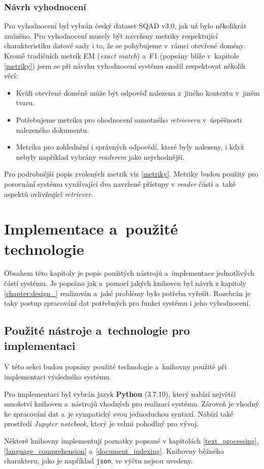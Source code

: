 \subsection{Návrh vyhodnocení}
Pro vyhodnocení byl vybrán český dataset SQAD v3.0, jak už bylo několikrát zmíněno. Pro vyhodnocení musely být navrženy metriky respektující charakteristiku datové sady i to, že se pohybujeme v~rámci otevřené domény. Kromě tradičních metrik EM (\emph{exact match}) a~F1 (popsány blíže v~kapitole \ref{metriky}) jsem se při návrhu vyhodnocení systému snažil respektovat několik věcí:
\begin{itemize}
    \item Kvůli otevřené doméně může být odpověď nalezena z~jiného kontextu v~jiném tvaru.
    \item Potřebujeme metriku pro ohodnocení samotného \emph{retrieveru} v~úspěšnosti nalezeného dokumentu.
    \item Metriku pro zohlednění i správných odpovědí, které byly nalezeny, i když nebyly například vybrány \emph{readerem} jako nejvhodnější.
\end{itemize}
Pro podrobnější popis zvolených metrik viz \ref{metriky}. Metriky budou použity pro porovnání systému využívající dva navržené přístupy v \emph{reader} části a~také aspektů ovlivňující \emph{retriever}.


\chapter{Implementace a~použité technologie}
\label{chapter:implementace}
Obsahem této kapitoly je popis použitých nástrojů a~implementace jednotlivých částí systému. Je popsáno jak a~pomocí jakých knihoven byl návrh z kapitoly \ref{chapter:design_} realizován a~jaké problémy bylo potřeba vyřešit. Rozebrán je taky postup zpracování dat potřebných pro funkci systému i jeho vyhodnocení.

\section{Použité nástroje a~technologie pro implementaci}
\label{pouzite_nastroje}
V této sekci budou popsány použité technologie a~knihovny použité při implementaci výsledného systému.\par
Pro implementaci byl vybrán jazyk \textbf{Python} (3.7.10), který nabízí největší množství knihoven a~nástrojů vhodných pro realizaci systému. Zároveň je vhodný ke zpracování dat a~je sympatický svou jednoduchou syntaxí. Nabízí také prostředí \emph{Jupyter notebook}, který je velmi pohodlný pro vývoj.\par
Některé knihovny implementují poznatky popsané v kapitolách \ref{text_processing}, \ref{language_comprehension} a~\ref{document_indexing}. Knihovny běžného charakteru, jako je například \texttt{json}, ve výčtu nejsou uvedeny.

